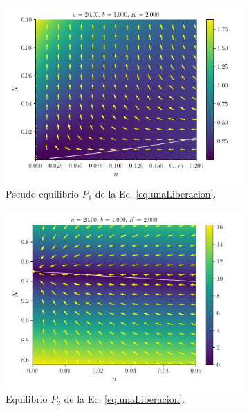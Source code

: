 \documentclass[twocolumn,aps,prl]{revtex4-1}
\begin{document}
\begin{figure}[ht!]
    \centering
    \begin{subfigure}[b]{0.49\linewidth}
        \centering
        \includegraphics[width = 0.999\textwidth]{figuras/campo-P1.pdf}
        \caption{Pseudo equilibrio $P_1$ de la Ec. \ref{eq:unaLiberacion}.}
        \label{fig:figuras/campo-P1}
    \end{subfigure}\quad
    \begin{subfigure}[b]{0.49\linewidth}
        \centering
        \includegraphics[width = 0.999\textwidth]{figuras/campo-P2.pdf}
        \caption{Equilibrio $P_2$ de la Ec. \ref{eq:unaLiberacion}.}
        \label{fig:figuras/campo-P2}
    \end{subfigure}\quad
    \caption{}
    \label{fig:figuras/campo-P}
\end{figure}
\end{document}
